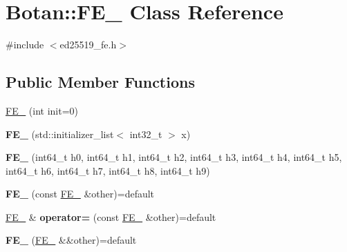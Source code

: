 \hypertarget{class_botan_1_1_f_e__25519}{}\section{Botan\+:\+:F\+E\+\_ Class Reference}
\label{class_botan_1_1_f_e__25519}


{\ttfamily \#include $<$ed25519\+\_\+fe.\+h$>$}

\subsection*{Public Member Functions}
\begin{DoxyCompactItemize}
\item 
\mbox{\hyperlink{class_botan_1_1_f_e__25519_abcdb26d1c8833290950d7aafabac1e94}{F\+E\+\_}} (int init=0)
\item 
\mbox{\label{class_botan_1_1_f_e__25519_a75bb56f142bf71c08628df7a20af5669}} 
{\bfseries F\+E\+\_} (std\+::initializer\+\_\+list$<$ int32\+\_\+t $>$ x)
\item 
\mbox{\label{class_botan_1_1_f_e__25519_a3dd5099962d012c63624fafd83dd4bca}} 
{\bfseries F\+E\+\_} (int64\+\_\+t h0, int64\+\_\+t h1, int64\+\_\+t h2, int64\+\_\+t h3, int64\+\_\+t h4, int64\+\_\+t h5, int64\+\_\+t h6, int64\+\_\+t h7, int64\+\_\+t h8, int64\+\_\+t h9)
\item 
\mbox{\label{class_botan_1_1_f_e__25519_a1f2b347991deafb4362b58f270041027}} 
{\bfseries F\+E\+\_} (const \mbox{\hyperlink{class_botan_1_1_f_e__25519}{F\+E\+\_}} \&other)=default
\item 
\mbox{\label{class_botan_1_1_f_e__25519_a04ba6d84deb89287ce0befaec11a551f}} 
\mbox{\hyperlink{class_botan_1_1_f_e__25519}{F\+E\+\_}} \& {\bfseries operator=} (const \mbox{\hyperlink{class_botan_1_1_f_e__25519}{F\+E\+\_}} \&other)=default
\item 
\mbox{\label{class_botan_1_1_f_e__25519_a849c48b40c5958e7b81c955360c3bb97}} 
{\bfseries F\+E\+\_} (\mbox{\hyperlink{class_botan_1_1_f_e__25519}{F\+E\+\_}} \&\&other)=default
\item 

\end{DoxyCompactItemize}
